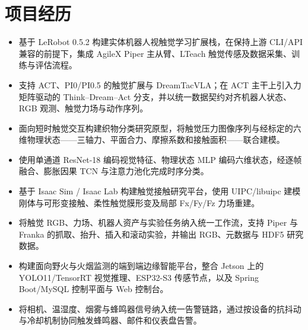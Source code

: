 
\section{项目经历}

\begin{itemize}
\cvprojectbodyfont
    \item 基于 LeRobot 0.5.2 构建实体机器人视触觉学习扩展栈，在保持上游 CLI/API 兼容的前提下，集成 AgileX Piper 主从臂、LTeach 触觉传感及数据采集、训练与评估流程。
    \item 支持 ACT、PI0/PI0.5 的触觉扩展与 DreamTacVLA；在 ACT 主干上引入力矩阵驱动的 Think--Dream--Act 分支，并以统一数据契约对齐机器人状态、RGB 观测、触觉力场与动作序列。
\end{itemize}

\begin{itemize}
\cvprojectbodyfont
    \item 面向短时触觉交互构建织物分类研究原型，将触觉压力图像序列与经标定的六维物理状态——三轴力、平面合力、摩擦系数和接触面积——联合建模。
    \item 使用单通道 ResNet-18 编码视觉特征、物理状态 MLP 编码六维状态，经逐帧融合、膨胀因果 TCN 与注意力池化完成时序分类。
\end{itemize}

\begin{itemize}
\cvprojectbodyfont
    \item 基于 Isaac Sim / Isaac Lab 构建触觉接触研究平台，使用 UIPC/libuipc 建模刚体与可形变接触、柔性触觉膜形变及局部 Fx/Fy/Fz 力场重建。
    \item 将触觉 RGB、力场、机器人资产与实验任务纳入统一工作流，支持 Piper 与 Franka 的抓取、抬升、插入和滚动实验，并输出 RGB、元数据与 HDF5 研究数据。
\end{itemize}

\begin{itemize}
\cvprojectbodyfont
    \item 构建面向野火与火烟监测的端到端边缘智能平台，整合 Jetson 上的 YOLO11/TensorRT 视觉推理、ESP32-S3 传感节点，以及 Spring Boot/MySQL 控制平面与 Web 控制台。
    \item 将相机、温湿度、烟雾与蜂鸣器信号纳入统一告警链路，通过按设备的抗抖动与冷却机制协同触发蜂鸣器、邮件和仪表盘告警。
\end{itemize}

